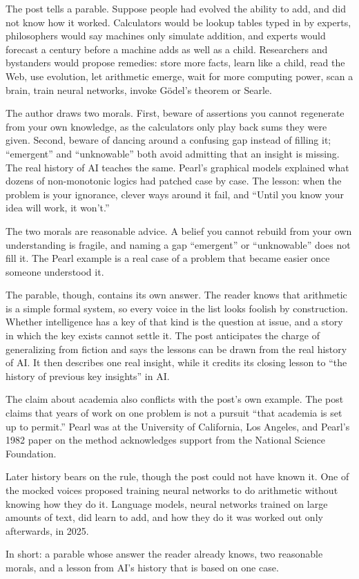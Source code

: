 \begin{afterword}
\summaryhead

The post tells a parable. Suppose people had evolved the ability to add, and did not know how it worked. Calculators would be lookup tables typed in by experts, philosophers would say machines only simulate addition, and experts would forecast a century before a machine adds as well as a child. Researchers and bystanders would propose remedies: store more facts, learn like a child, read the Web, use evolution, let arithmetic emerge, wait for more computing power, scan a brain, train neural networks, invoke G\"odel's theorem or Searle.

The author draws two morals. First, beware of assertions you cannot regenerate from your own knowledge, as the calculators only play back sums they were given. Second, beware of dancing around a confusing gap instead of filling it; ``emergent'' and ``unknowable'' both avoid admitting that an insight is missing. The real history of AI teaches the same. Pearl's graphical models explained what dozens of non-monotonic logics had patched case by case. The lesson: when the problem is your ignorance, clever ways around it fail, and ``Until you know your idea will work, it won't.''

\responsehead

The two morals are reasonable advice. A belief you cannot rebuild from your own understanding is fragile, and naming a gap ``emergent'' or ``unknowable'' does not fill it. The Pearl example is a real case of a problem that became easier once someone understood it.

The parable, though, contains its own answer. The reader knows that arithmetic is a simple formal system, so every voice in the list looks foolish by construction. Whether intelligence has a key of that kind is the question at issue, and a story in which the key exists cannot settle it. The post anticipates the charge of generalizing from fiction and says the lessons can be drawn from the real history of AI. It then describes one real insight, while it credits its closing lesson to ``the history of previous key insights'' in AI.

The claim about academia also conflicts with the post's own example. The post claims that years of work on one problem is not a pursuit ``that academia is set up to permit.'' Pearl was at the University of California, Los Angeles, and Pearl's 1982 paper on the method acknowledges support from the National Science Foundation.

Later history bears on the rule, though the post could not have known it. One of the mocked voices proposed training neural networks to do arithmetic without knowing how they do it. Language models, neural networks trained on large amounts of text, did learn to add, and how they do it was worked out only afterwards, in 2025.

In short: a parable whose answer the reader already knows, two reasonable morals, and a lesson from AI's history that is based on one case.
\end{afterword}
